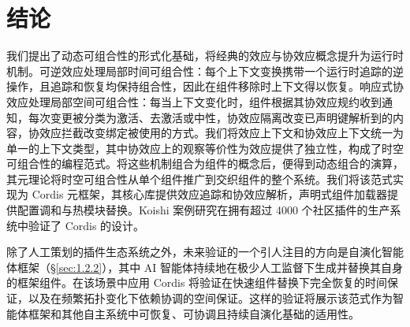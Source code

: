 \section{结论}
\label{sec:8}

我们提出了动态可组合性的形式化基础，将经典的效应与协效应概念提升为运行时机制。可逆效应处理局部时间可组合性：每个上下文变换携带一个运行时追踪的逆操作，且追踪和恢复均保持组合性，因此在组件移除时上下文得以恢复。响应式协效应处理局部空间可组合性：每当上下文变化时，组件根据其协效应规约收到通知，每次变更被分类为激活、去激活或中性，协效应隔离改变已声明键解析到的内容，协效应拦截改变绑定被使用的方式。我们将效应上下文和协效应上下文统一为单一的上下文类型，其中协效应上的观察等价性为效应提供了独立性，构成了时空可组合性的编程范式。将这些机制组合为组件的概念后，便得到动态组合的演算，其元理论将时空可组合性从单个组件推广到交织组件的整个系统。我们将该范式实现为 Cordis 元框架，其核心库提供效应追踪和协效应解析，声明式组件加载器提供配置调和与热模块替换。Koishi 案例研究在拥有超过 4000 个社区插件的生产系统中验证了 Cordis 的设计。

除了人工策划的插件生态系统之外，未来验证的一个引人注目的方向是自演化智能体框架（\S\ref{sec:1.2.2}），其中 AI 智能体持续地在极少人工监督下生成并替换其自身的框架组件。在该场景中应用 Cordis 将验证在快速组件替换下完全恢复的时间保证，以及在频繁拓扑变化下依赖协调的空间保证。这样的验证将展示该范式作为智能体框架和其他自主系统中可恢复、可协调且持续自演化基础的适用性。
